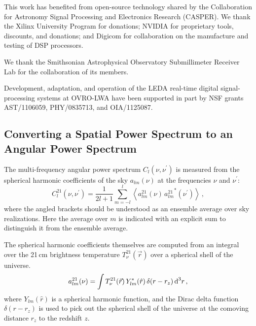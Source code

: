 \begin{bibunit}
This work has benefited from open-source technology shared by the Collaboration for Astronomy Signal
Processing and Electronics Research (CASPER).  We thank the Xilinx University Program for donations;
NVIDIA for proprietary tools, discounts, and donations; and Digicom for collaboration on the
manufacture and testing of DSP processors.

We thank the Smithsonian Astrophysical Observatory Submillimeter Receiver Lab for the collaboration
of its members.

Development, adaptation, and operation of the LEDA real-time digital signal-processing systems at
OVRO-LWA have been supported in part by NSF grants AST/1106059, PHY/0835713, and OIA/1125087.

\begin{subappendices}

\section{Converting a Spatial Power Spectrum to an Angular Power Spectrum}
\label{app:spatial-to-angular}

The multi-frequency angular power spectrum $C_l(\nu, \nu^\prime)$ is measured from the spherical
harmonic coefficients of the sky $a_{lm}(\nu)$ at the frequencies $\nu$ and $\nu^\prime$:
\begin{equation}
    C^{21}_l(\nu, \nu^\prime) = \frac{1}{2l+1}\sum_{m = -l}^l \left\langle
        a^{21}_{lm}(\nu) \, {a^{21}_{lm}}^*(\nu^\prime)
    \right\rangle\,,
\end{equation}
where the angled brackets should be understood as an ensemble average over sky realizations. Here
the average over $m$ is indicated with an explicit sum to distinguish it from the ensemble average.

The spherical harmonic coefficients themselves are computed from an integral over the 21\,cm
brightness temperature $T^{21}_\nu(\vec r)$ over a spherical shell of the universe.
\begin{equation}
    a^{21}_{lm}(\nu) = \int T^{21}_\nu(\vec r) \, Y_{lm}^*(\hat r) \, \delta(r - r_z) \, {\textrm d}^3r\,,
\end{equation}
where $Y_{lm}(\hat r)$ is a spherical harmonic function, and the Dirac delta function
$\delta(r-r_z)$ is used to pick out the spherical shell of the universe at the comoving distance
$r_z$ to the redshift $z$.


\end{subappendices}
\end{bibunit}
